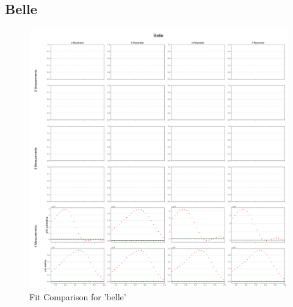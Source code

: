 \documentclass[a4paper,12pt]{article}
\begin{document}
\subsection{Belle}
\begin{figure}[H]
    \centering
    \includegraphics[scale=0.3]{../compare/belle_soft_compare.png}
    \caption{Fit Comparison for 'belle'}
\end{figure}
\end{document}
